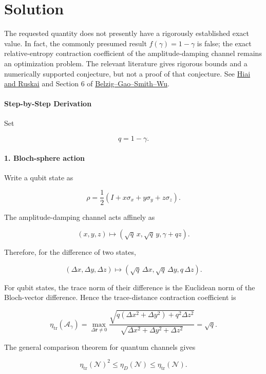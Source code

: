\documentclass[11pt]{article}
\begin{document}
\section*{Solution}
The requested quantity does not presently have a rigorously established exact value. In fact, the commonly presumed result $f(\gamma)=1-\gamma$ is false; the exact relative-entropy contraction coefficient of the amplitude-damping channel remains an optimization problem. The relevant literature gives rigorous bounds and a numerically supported conjecture, but not a proof of that conjecture. See \href{\detokenize{https://arxiv.org/abs/1508.03551}}{Hiai and Ruskai} and Section 6 of \href{\detokenize{https://arxiv.org/abs/2411.19890}}{Belzig--Gao--Smith--Wu}.

\paragraph*{Step-by-Step Derivation}

Set

\[
q=1-\gamma.
\]

\paragraph*{1. Bloch-sphere action}

Write a qubit state as

\[
\rho=\frac12\left(I+x\sigma_x+y\sigma_y+z\sigma_z\right).
\]

The amplitude-damping channel acts affinely as

\[
(x,y,z)\longmapsto
\left(\sqrt q\,x,\sqrt q\,y,\gamma+qz\right).
\]

Therefore, for the difference of two states,

\[
(\Delta x,\Delta y,\Delta z)
\longmapsto
\left(\sqrt q\,\Delta x,\sqrt q\,\Delta y,q\,\Delta z\right).
\]

For qubit states, the trace norm of their difference is the Euclidean norm of the Bloch-vector difference. Hence the trace-distance contraction coefficient is

\[
\eta_{\mathrm{tr}}(\mathcal A_\gamma)
=
\max_{\Delta\mathbf r\ne0}
\frac{\sqrt{q(\Delta x^2+\Delta y^2)+q^2\Delta z^2}}
{\sqrt{\Delta x^2+\Delta y^2+\Delta z^2}}
=\sqrt q.
\]

The general comparison theorem for quantum channels gives

\[
\eta_{\mathrm{tr}}(\mathcal N)^2
\leq
\eta_D(\mathcal N)
\leq
\eta_{\mathrm{tr}}(\mathcal N).
\]
\end{document}
